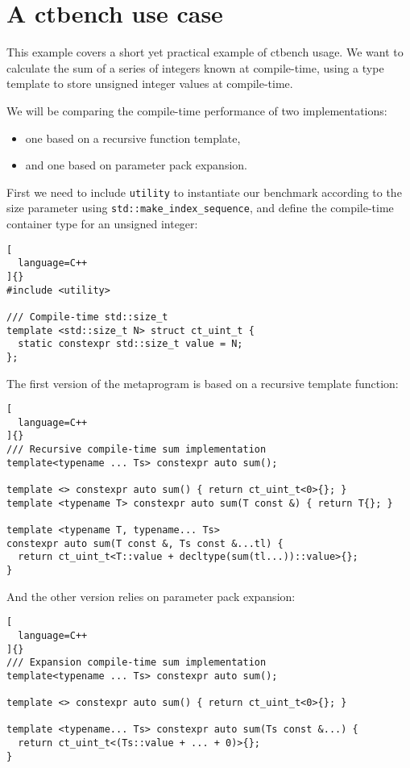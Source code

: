 \documentclass[../main]{subfiles}
\begin{document}
\section{
  A ctbench use case
}

This example covers a short yet practical example of ctbench usage. We want to
calculate the sum of a series of integers known at compile-time, using a type
template to store unsigned integer values at compile-time.

We will be comparing the compile-time performance of two implementations:

\begin{itemize}
\item one based on a recursive function template,
\item and one based on  parameter pack expansion.
\end{itemize}

First we need to include \lstinline{utility} to instantiate our benchmark
according to the size parameter using \lstinline{std::make_index_sequence}, and
define the compile-time container type for an unsigned integer:

\begin{lstlisting}[
  language=C++
]{}
#include <utility>

/// Compile-time std::size_t
template <std::size_t N> struct ct_uint_t {
  static constexpr std::size_t value = N;
};
\end{lstlisting}

The first version of the metaprogram is based on a recursive template function:

\begin{lstlisting}[
  language=C++
]{}
/// Recursive compile-time sum implementation
template<typename ... Ts> constexpr auto sum();

template <> constexpr auto sum() { return ct_uint_t<0>{}; }
template <typename T> constexpr auto sum(T const &) { return T{}; }

template <typename T, typename... Ts>
constexpr auto sum(T const &, Ts const &...tl) {
  return ct_uint_t<T::value + decltype(sum(tl...))::value>{};
}
\end{lstlisting}

And the other version relies on  parameter pack expansion:

\begin{lstlisting}[
  language=C++
]{}
/// Expansion compile-time sum implementation
template<typename ... Ts> constexpr auto sum();

template <> constexpr auto sum() { return ct_uint_t<0>{}; }

template <typename... Ts> constexpr auto sum(Ts const &...) {
  return ct_uint_t<(Ts::value + ... + 0)>{};
}
\end{lstlisting}
\end{document}
